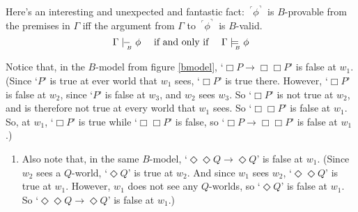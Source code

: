 \documentclass[landscape, two column, full page,reqno]{article}
\newcommand{\qe}{\begin{enumerate}[align=left,style=nextline,leftmargin=17pt,labelsep=5pt,font=\normalfont]}
\newcommand{\ze}{\end{enumerate}}
\newcommand{\p}{\item}
\newcommand{\qq}[1]{ ~\!^\ulcorner #1  ^\urcorner~\!}
\newcommand{\bmodels}{\models_{\!\!\!\raisebox{-3pt}{\text{\tiny$B$}}}}
\newcommand{\bproves}{\mid\hspace{-3.9pt}-_{\!\!\!\raisebox{-3pt}{\text{\tiny$B$}}}\hspace{3pt}}
\newcommand{\D}{\Diamond}
\newcommand{\B}{\Box}
\begin{document}
\p Here's an interesting and unexpected and fantastic fact: $\qq{\phi}$ is $B$-provable from the premises in  $\Gamma$ iff the argument from $\Gamma$ to $\qq{\phi}$ is $B$-valid.
			\[
			\Gamma \bproves \phi \quad \mbox{ if and only if } \quad \Gamma \bmodels \phi
			\]
			
\p Notice that, in the $B$-model from figure \ref{bmodel}, `$\B P \to \B \B P$' is false at $w_1$.  (Since `$P$' is true at ever world that $w_1$ sees, `$\B P$' is true there.  However, `$\B P$' is false at $w_2$, since `$P$' is false at $w_3$, and $w_2$ sees $w_3$.  So `$\B P$' is not true at $w_2$, and is therefore not true at every world that $w_1$ sees.  So `$\B \B P$' is false at $w_1$.  So, at $w_1$, `$\B P$' is true while `$\B \B P$' is false, so `$\B P \to \B \B P$' is false at $w_1$.)
	\qe
	\p Also note that, in the same $B$-model, `$\D \D Q \to \D Q$' is false at $w_1$.  (Since $w_2$ sees a $Q$-world, `$\D Q$' is true at $w_2$.  And since $w_1$ sees $w_2$, `$\D \D Q$' is true at $w_1$.  However, $w_1$ does not see any $Q$-worlds, so `$\D Q$' is false at $w_1$.  So `$\D \D Q \to \D Q$' is false at $w_1$.)
	\ze 
\end{document}
